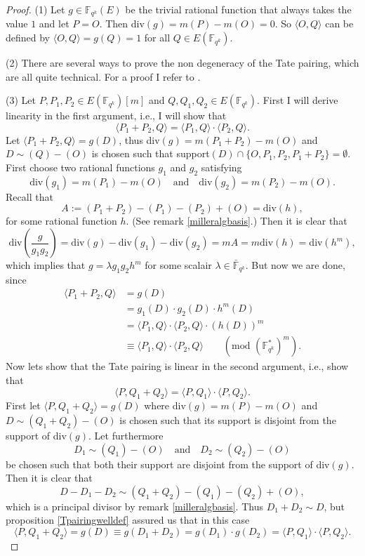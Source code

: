 \documentclass{article}
\numberwithin{equation}{section}
\theoremstyle{definition}
\newcommand{\FF}[1]{{\mathbb F}_{#1}} %
\newcommand{\FFCL}[1]{{\bar {\mathbb F}}_{#1}} %
\begin{document}
\begin{proof}
(1) Let $g\in \FF{q^k}(E)$ be the trivial rational function that always takes the value $1$ and let $P=O$. Then div$(g)=m(P)-m(O)=0$. So $\langle O,Q \rangle$ can be defined by $\langle O,Q \rangle = g(Q) = 1$ for all $Q \in E(\FF{q^k})$. \par 
(2) There are several ways to prove the non degeneracy of the Tate pairing, which are all quite technical. For a proof I refer to \cite{freyrucksecond}.\par 
(3) Let $P,P_1,P_2 \in E(\FF{q^k})[m]$ and $Q,Q_1,Q_2 \in E(\FF{q^k})$. First I will derive linearity in the first argument, i.e., I will show that $$\langle P_1+P_2,Q \rangle = \langle P_1,Q \rangle \cdot \langle P_2,Q \rangle.$$ Let $\langle P_1+P_2,Q \rangle = g(D)$, thus div$(g)=m(P_1+P_2)-m(O)$ and $D \sim (Q)-(O)$ is chosen such that support$(D) \cap \{O,P_1,P_2,P_1+P_2 \} = \emptyset$. First choose two rational functions $g_1$ and $g_2$ satisfying $$ \text{div}(g_1)=m(P_1)-m(O) \quad \text{and}\quad \text{div}(g_2)=m(P_2)-m(O).$$ Recall that $$A:=(P_1+P_2)-(P_1)-(P_2)+(O)=\text{div}(h),$$ for some rational function $h$. (See remark \ref{milleralgbasis}.) Then it is clear that $$\text{div}\left( \frac{g}{g_1g_2} \right) = \text{div}(g)-\text{div}(g_1) - \text{div}(g_2)=mA=m\text{div}(h)=\text{div}(h^m),$$ which implies that $g=\lambda g_1g_2h^m$ for some scalair $\lambda \in \FFCL{q^k}$. But now we are done, since 
\begin{align*} \langle P_1+P_2,Q \rangle &= g(D)\\ &= g_1(D)\cdot g_2(D) \cdot h^m(D)\\ &= \langle P_1,Q \rangle \cdot \langle P_2,Q \rangle \cdot (h(D))^m \\ &\equiv \langle P_1,Q \rangle \cdot \langle P_2,Q \rangle \qquad (\text{mod } (\FF{q^k}^*)^m). \end{align*} 
Now lets show that the Tate pairing is linear in the second argument, i.e., show that $$\langle P,Q_1+Q_2 \rangle = \langle P,Q_1 \rangle \cdot \langle P,Q_2 \rangle.$$ First let $\langle P,Q_1+Q_2 \rangle = g(D)$ where div$(g)=m(P)-m(O)$ and $D \sim (Q_1+Q_2)-(O)$ is chosen such that its support is disjoint from the support of div$(g)$. Let furthermore $$D_1 \sim (Q_1)-(O) \quad \text{and} \quad D_2 \sim (Q_2)-(O)$$ be chosen such that both their support are disjoint from the support of div$(g)$. Then it is clear that $$D-D_1-D_2 \sim (Q_1+Q_2)-(Q_1)-(Q_2)+(O),$$ which is a principal divisor by remark \ref{milleralgbasis}. Thus $D_1+D_2 \sim D$, but proposition \ref{Tpairingwelldef} assured us that in this case $$\langle P,Q_1+Q_2 \rangle = g(D) \equiv g(D_1+D_2) = g(D_1) \cdot g(D_2) = \langle P,Q_1 \rangle \cdot \langle P,Q_2 \rangle.$$
\end{proof}
\end{document}
